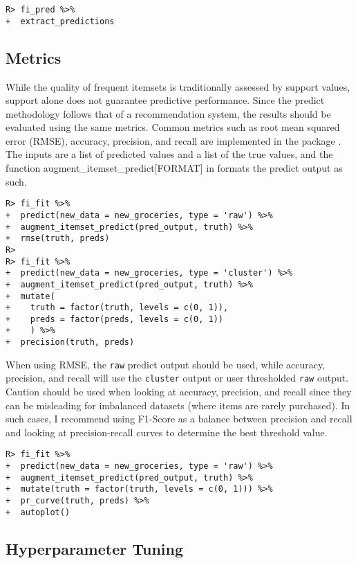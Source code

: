 \documentclass[
  article]{jss}
\begin{document}
\begin{verbatim}
R> fi_pred %>%
+  extract_predictions
\end{verbatim}

\subsection{Metrics}\label{metrics}

While the quality of frequent itemsets is traditionally assessed by
support values, support alone does not guarantee predictive performance.
Since the predict methodology follows that of a recommendation system,
the results should be evaluated using the same metrics. Common metrics
such as root mean squared error (RMSE), accuracy, precision, and recall
are implemented in the  package
\citep{kuhn_yardstick_2024}. The inputs are a list of predicted values
and a list of the true values, and the function
augment\_itemset\_predict{[}FORMAT{]} in  formats the
predict output as such.

\begin{verbatim}
R> fi_fit %>%
+  predict(new_data = new_groceries, type = 'raw') %>%
+  augment_itemset_predict(pred_output, truth) %>%
+  rmse(truth, preds)
R> 
R> fi_fit %>%
+  predict(new_data = new_groceries, type = 'cluster') %>%
+  augment_itemset_predict(pred_output, truth) %>%
+  mutate(
+    truth = factor(truth, levels = c(0, 1)), 
+    preds = factor(preds, levels = c(0, 1))
+    ) %>%
+  precision(truth, preds)
\end{verbatim}

When using RMSE, the \texttt{raw} predict output should be used, while
accuracy, precision, and recall will use the \texttt{cluster} output or
user thresholded \texttt{raw} output. Caution should be used when
looking at accuracy, precision, and recall since they can be misleading
for imbalanced datasets (where items are rarely purchased). In such
cases, I recommend using F1-Score as a balance between precision and
recall and looking at precision-recall curves
\citep{saito_precision-recall_2015} to determine the best threshold
value.

\begin{verbatim}
R> fi_fit %>%
+  predict(new_data = new_groceries, type = 'raw') %>%
+  augment_itemset_predict(pred_output, truth) %>%
+  mutate(truth = factor(truth, levels = c(0, 1))) %>%
+  pr_curve(truth, preds) %>%
+  autoplot()
\end{verbatim}

\subsection{Hyperparameter Tuning}\label{hyperparameter-tuning}
\end{document}
